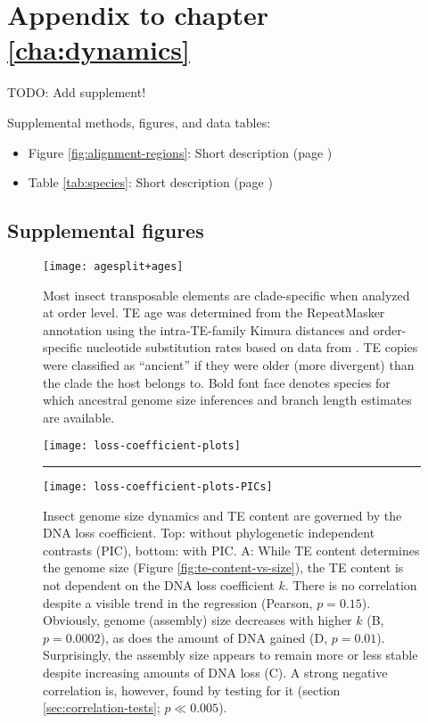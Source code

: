 \chapter{Appendix to chapter \ref{cha:dynamics}}

TODO: Add supplement!

\ifdraft{%
}%
{%
}%

Supplemental methods, figures, and data tables:

\begin{itemize}
	\item Figure \ref{fig:alignment-regions}: Short description (page \pageref{fig:alignment-regions})
\end{itemize}

\begin{itemize}
	\item Table \ref{tab:species}: Short description (page \pageref{tab:species})
\end{itemize}

\section{Supplemental figures}

\begin{figure}[h!]
\centering
\texttt{[image: agesplit+ages]}
\caption[Most insect TEs are clade-specific]{Most insect transposable elements are clade-specific when analyzed at order level. TE age was determined from the RepeatMasker \citep{Smit2015} annotation using the intra-TE-family Kimura distances and order-specific nucleotide substitution rates based on data from \citet{Misof2014}. TE copies were classified as ``ancient'' if they were older (more divergent) than the clade the host belongs to. Bold font face denotes species for which ancestral genome size inferences and branch length estimates are available.}
\label{fig:agesplit}
\end{figure}

\begin{figure}[h!]
\centering
\texttt{[image: loss-coefficient-plots]}
\rule{\textwidth}{0.2pt}

\bigskip

\texttt{[image: loss-coefficient-plots-PICs]}
\caption[]{Insect genome size dynamics and TE content are governed by the DNA loss coefficient. Top: without phylogenetic independent contrasts (PIC), bottom: with PIC. A: While TE content determines the genome size (Figure \ref{fig:te-content-vs-size}), the TE content is not dependent on the DNA loss coefficient $k$. There is no correlation despite a visible trend in the regression (Pearson, $p = 0.15$). Obviously, genome (assembly) size decreases with higher $k$ (B, $p = 0.0002$), as does the amount of DNA gained (D, $p = 0.01$). Surprisingly, the assembly size appears to remain more or less stable despite increasing amounts of DNA loss (C). A strong negative correlation is, however, found by testing for it (section \ref{sec:correlation-tests}; $p \ll 0.005$).}
\label{fig:loss-coefficient}
\end{figure}

